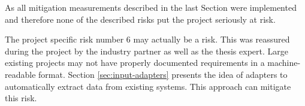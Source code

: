 As all mitigation measurements described in the last Section were implemented and therefore none of the described risks put the project seriously at risk.

The project specific risk number 6 may actually be a risk. This was reassured during the project by the industry partner as well as the thesis expert. Large existing projects may not have properly documented requirements in a machine-readable format. Section \ref{sec:input-adapters} presents the idea of adapters to automatically extract data from existing systems. This approach can mitigate this risk.
